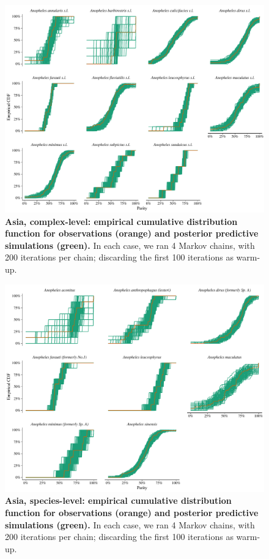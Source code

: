 \documentclass[12pt]{article}
\begin{document}
{\begin{figure}[ht]
	\centerline{\includegraphics[width=1\textwidth]{./Figure_files/detinova_ecdf_asia_grouped.pdf}}
	\caption{\textbf{Asia, complex-level: empirical cumulative distribution function for observations (orange) and posterior predictive simulations (green).} In each case, we ran 4 Markov chains, with 200 iterations per chain; discarding the first 100 iterations as warm-up.}\label{fig:detinova_ecdf_asia_grouped}
\end{figure}

\begin{figure}[ht]
	\centerline{\includegraphics[width=1\textwidth]{./Figure_files/detinova_ecdf_asia_species.pdf}}
	\caption{\textbf{Asia, species-level: empirical cumulative distribution function for observations (orange) and posterior predictive simulations (green).} In each case, we ran 4 Markov chains, with 200 iterations per chain; discarding the first 100 iterations as warm-up.}\label{fig:detinova_ecdf_asia_species}
\end{figure}

}
\end{document}
